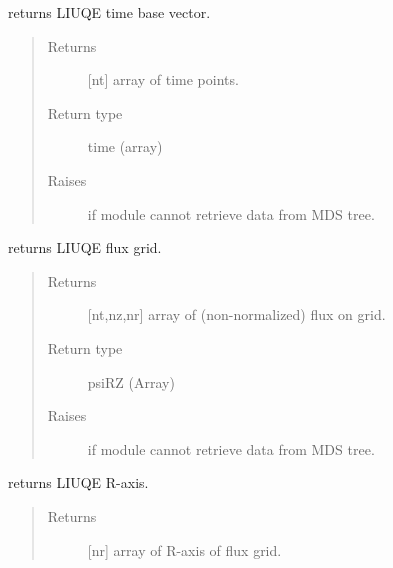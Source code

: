 \documentclass[letterpaper,10pt,english]{sphinxmanual}
\begin{document}
\begin{fulllineitems}
\begin{fulllineitems}
\label{\detokenize{eqtools:eqtools.TCVLIUQE.TCVLIUQETree.getTimeBase}}
returns LIUQE time base vector.
\begin{quote}\begin{description}
\item[{Returns}] \leavevmode
{[}nt{]} array of time points.

\item[{Return type}] \leavevmode
time (array)

\item[{Raises}] \leavevmode
{} \textendash{} if module cannot retrieve data from MDS tree.

\end{description}\end{quote}

\end{fulllineitems}


\begin{fulllineitems}
\label{\detokenize{eqtools:eqtools.TCVLIUQE.TCVLIUQETree.getFluxGrid}}
returns LIUQE flux grid.
\begin{quote}\begin{description}
\item[{Returns}] \leavevmode
{[}nt,nz,nr{]} array of (non-normalized) flux on grid.

\item[{Return type}] \leavevmode
psiRZ (Array)

\item[{Raises}] \leavevmode
{} \textendash{} if module cannot retrieve data from MDS tree.

\end{description}\end{quote}

\end{fulllineitems}


\begin{fulllineitems}
\label{\detokenize{eqtools:eqtools.TCVLIUQE.TCVLIUQETree.getRGrid}}
returns LIUQE R-axis.
\begin{quote}\begin{description}
\item[{Returns}] \leavevmode
{[}nr{]} array of R-axis of flux grid.


\end{description}
\end{quote}
\end{fulllineitems}
\end{fulllineitems}
\end{document}
